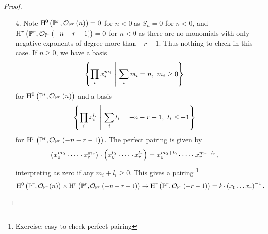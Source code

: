 \begin{proof}
\begin{itemize}
\pagebreak

\item[$ 4 $.] Note $ \H^0\br{\PP^r, \OOO_{\PP^r}\br{n}} = 0 $ for $ n < 0 $ as $ S_n = 0 $ for $ n < 0 $, and $ \H^r\br{\PP^r, \OOO_{\PP^r}\br{-n - r - 1}} = 0 $ for $ n < 0 $ as there are no monomials with only negative exponents of degree more than $ -r - 1 $. Thus nothing to check in this case. If $ n \ge 0 $, we have a basis
$$ \cbr{\prod_i x_i^{m_i} \st \sum_i m_i = n, \ m_i \ge 0} $$
for $ \H^0\br{\PP^r, \OOO_{\PP^r}\br{n}} $ and a basis
$$ \cbr{\prod_i x_i^{l_i} \st \sum_i l_i = -n - r - 1, \ l_i \le -1} $$
for $ \H^r\br{\PP^r, \OOO_{\PP^r}\br{-n - r - 1}} $. The perfect pairing is given by
$$ \br{x_0^{m_0} \cdot \dots \cdot x_r^{m_r}} \cdot \br{x_0^{l_0} \cdot \dots \cdot x_r^{l_r}} = x_0^{m_0 + l_0} \cdot \dots \cdot x_r^{m_r + l_r}, $$
interpreting as zero if any $ m_i + l_i \ge 0 $. This gives a pairing \footnote{Exercise: easy to check perfect pairing}
$$ \H^0\br{\PP^r, \OOO_{\PP^r}\br{n}} \times \H^r\br{\PP^r, \OOO_{\PP^r}\br{-n - r - 1}} \to \H^r\br{\PP^r, \OOO_{\PP^r}\br{-r - 1}} = k \cdot \br{x_0 \dots x_r}^{-1}. $$



\end{itemize}
\end{proof}
